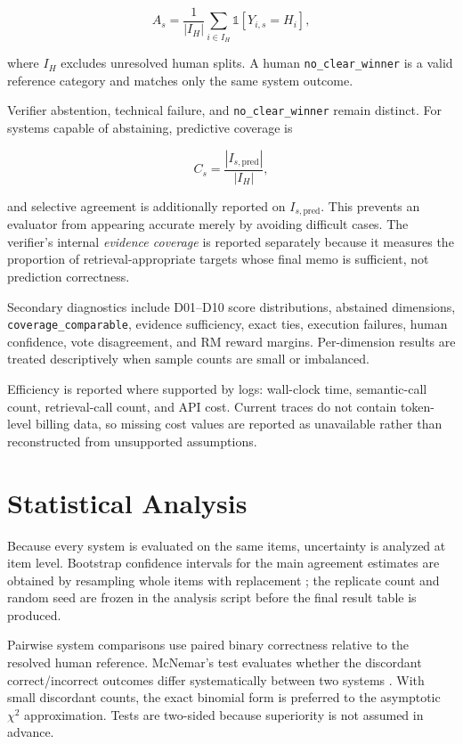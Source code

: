 \begin{equation}
A_s = \frac{1}{|I_H|}\sum_{i\in I_H}\mathbb{1}[Y_{i,s}=H_i],
\end{equation}

where $I_H$ excludes unresolved human splits. A human \texttt{no\_clear\_winner} is a valid reference category and matches only the same system outcome.

Verifier abstention, technical failure, and \texttt{no\_clear\_winner} remain distinct. For systems capable of abstaining, predictive coverage is

\begin{equation}
C_s = \frac{|I_{s,\mathrm{pred}}|}{|I_H|},
\end{equation}

and selective agreement is additionally reported on $I_{s,\mathrm{pred}}$. This prevents an evaluator from appearing accurate merely by avoiding difficult cases. The verifier's internal \emph{evidence coverage} is reported separately because it measures the proportion of retrieval-appropriate targets whose final memo is sufficient, not prediction correctness.

Secondary diagnostics include D01--D10 score distributions, abstained dimensions, \texttt{coverage\_comparable}, evidence sufficiency, exact ties, execution failures, human confidence, vote disagreement, and RM reward margins. Per-dimension results are treated descriptively when sample counts are small or imbalanced.

Efficiency is reported where supported by logs: wall-clock time, semantic-call count, retrieval-call count, and API cost. Current traces do not contain token-level billing data, so missing cost values are reported as unavailable rather than reconstructed from unsupported assumptions.

\section{Statistical Analysis}

Because every system is evaluated on the same items, uncertainty is analyzed at item level. Bootstrap confidence intervals for the main agreement estimates are obtained by resampling whole items with replacement \parencite{efron1993bootstrap}; the replicate count and random seed are frozen in the analysis script before the final result table is produced.

Pairwise system comparisons use paired binary correctness relative to the resolved human reference. McNemar's test evaluates whether the discordant correct/incorrect outcomes differ systematically between two systems \parencite{mcnemar1947correlated}. With small discordant counts, the exact binomial form is preferred to the asymptotic $\chi^2$ approximation. Tests are two-sided because superiority is not assumed in advance.

